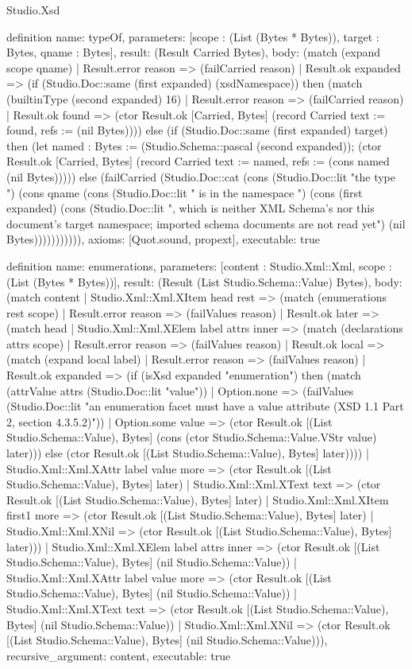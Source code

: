 \begin{lexlean}{Studio.Xsd}
\begin{semanticmodule}
definition{
  name: typeOf,
  parameters: [scope : (List (Bytes * Bytes)), target : Bytes, qname : Bytes],
  result: (Result Carried Bytes),
  body: (match (expand scope qname)
    | Result.error reason => (failCarried reason)
    | Result.ok expanded => (if (Studio.Doc::same (first expanded) (xsdNamespace)) then (match (builtinType (second expanded) 16)
      | Result.error reason => (failCarried reason)
      | Result.ok found => (ctor Result.ok [Carried, Bytes] (record Carried {text := found, refs := (nil Bytes)}))) else (if (Studio.Doc::same (first expanded) target) then (let named : Bytes := (Studio.Schema::pascal (second expanded)); (ctor Result.ok [Carried, Bytes] (record Carried {text := named, refs := (cons named (nil Bytes))}))) else (failCarried (Studio.Doc::cat (cons (Studio.Doc::lit "the type ") (cons qname (cons (Studio.Doc::lit " is in the namespace ") (cons (first expanded) (cons (Studio.Doc::lit ", which is neither XML Schema's nor this document's target namespace; imported schema documents are not read yet") (nil Bytes))))))))))),
  axioms: [Quot.sound, propext],
  executable: true
}

definition{
  name: enumerations,
  parameters: [content : Studio.Xml::Xml, scope : (List (Bytes * Bytes))],
  result: (Result (List Studio.Schema::Value) Bytes),
  body: (match content
    | Studio.Xml::Xml.XItem head rest => (match (enumerations rest scope)
      | Result.error reason => (failValues reason)
      | Result.ok later => (match head
        | Studio.Xml::Xml.XElem label attrs inner => (match (declarations attrs scope)
          | Result.error reason => (failValues reason)
          | Result.ok local => (match (expand local label)
            | Result.error reason => (failValues reason)
            | Result.ok expanded => (if (isXsd expanded "enumeration") then (match (attrValue attrs (Studio.Doc::lit "value"))
              | Option.none => (failValues (Studio.Doc::lit "an enumeration facet must have a value attribute (XSD 1.1 Part 2, section 4.3.5.2)"))
              | Option.some value => (ctor Result.ok [(List Studio.Schema::Value), Bytes] (cons (ctor Studio.Schema::Value.VStr value) later))) else (ctor Result.ok [(List Studio.Schema::Value), Bytes] later))))
        | Studio.Xml::Xml.XAttr label value more => (ctor Result.ok [(List Studio.Schema::Value), Bytes] later)
        | Studio.Xml::Xml.XText text => (ctor Result.ok [(List Studio.Schema::Value), Bytes] later)
        | Studio.Xml::Xml.XItem first1 more => (ctor Result.ok [(List Studio.Schema::Value), Bytes] later)
        | Studio.Xml::Xml.XNil => (ctor Result.ok [(List Studio.Schema::Value), Bytes] later)))
    | Studio.Xml::Xml.XElem label attrs inner => (ctor Result.ok [(List Studio.Schema::Value), Bytes] (nil Studio.Schema::Value))
    | Studio.Xml::Xml.XAttr label value more => (ctor Result.ok [(List Studio.Schema::Value), Bytes] (nil Studio.Schema::Value))
    | Studio.Xml::Xml.XText text => (ctor Result.ok [(List Studio.Schema::Value), Bytes] (nil Studio.Schema::Value))
    | Studio.Xml::Xml.XNil => (ctor Result.ok [(List Studio.Schema::Value), Bytes] (nil Studio.Schema::Value))),
  recursive_argument: content,
  executable: true
}


\end{semanticmodule}
\end{lexlean}
